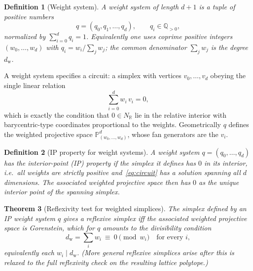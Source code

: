 \documentclass{amsart}
\newtheorem{theorem}{Theorem}[section]
\newtheorem{definition}[theorem]{Definition}
\begin{document}
\begin{definition}[Weight system]\label{def:weights}
A \emph{weight system} of length $d+1$ is a tuple of positive numbers
\begin{equation}
  q = (q_0, q_1, \dots, q_d), \qquad q_i \in \mathbb{Q}_{>0},
\end{equation}
normalized by $\sum_{i=0}^{d} q_i = 1$. Equivalently one uses coprime
positive \emph{integers} $(w_0,\dots,w_d)$ with $q_i = w_i / \sum_j w_j$;
the common denominator $\sum_j w_j$ is the \emph{degree} $d_{\mathrm{w}}$.
\end{definition}

A weight system specifies a circuit: a simplex with vertices
$v_0,\dots,v_d$ obeying the single linear relation
\begin{equation}\label{eq:circuit}
  \sum_{i=0}^{d} w_i\, v_i = 0,
\end{equation}
which is exactly the condition that $0 \in N_{\mathbb{R}}$ lie in the
relative interior with barycentric-type coordinates proportional to the
weights. Geometrically $q$ defines the weighted projective space
$\mathbb{P}^d_{(w_0,\dots,w_d)}$, whose fan generators are the $v_i$.

\begin{definition}[IP property for weight systems]\label{def:ipweights}
A weight system $q=(q_0,\dots,q_d)$ has the \emph{interior-point (IP)
property} if the simplex it defines has $0$ in its interior, i.e.\ all
weights are strictly positive and~\eqref{eq:circuit} has a solution spanning
all $d$ dimensions. The associated weighted projective space then has $0$
as the unique interior point of the spanning simplex.
\end{definition}

\begin{theorem}[Reflexivity test for weighted simplices]\label{thm:reflexweight}
The simplex defined by an IP weight system $q$ gives a \emph{reflexive}
simplex iff the associated weighted projective space is Gorenstein, which
for $q$ amounts to the divisibility condition
\begin{equation}
  d_{\mathrm{w}} = \sum_{i} w_i \ \equiv\ 0 \pmod{w_i}
  \quad\text{for every } i,
\end{equation}
equivalently each $w_i \mid d_{\mathrm{w}}$. (More general reflexive
simplices arise after this is relaxed to the full reflexivity check on the
resulting lattice polytope.)
\end{theorem}
\end{document}
